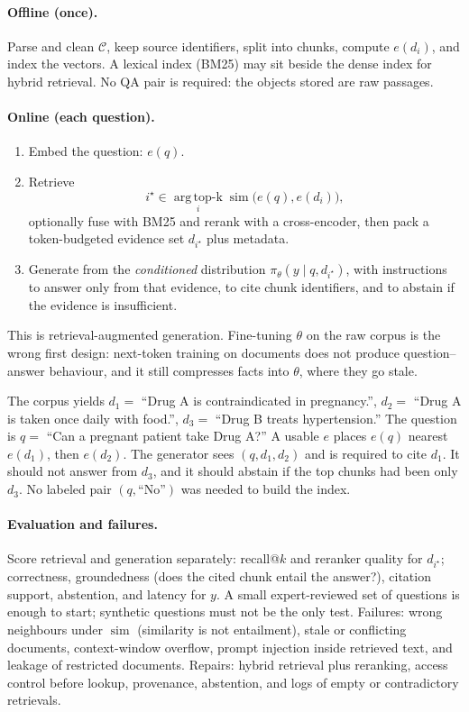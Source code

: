 \documentclass[11pt,a4paper]{article}
\theoremstyle{definition}
\begin{document}
\paragraph{Offline (once).}
Parse and clean \(\mathcal{C}\), keep source identifiers, split into chunks, compute \(e(d_i)\), and index the vectors. A lexical index (BM25) may sit beside the dense index for hybrid retrieval. No QA pair is required: the objects stored are raw passages.

\paragraph{Online (each question).}
\begin{enumerate}
    \item Embed the question: \(e(q)\).
    \item Retrieve
    \[
    i^\star\in\operatorname*{arg\,top\text{-}k}_{i}\operatorname{sim}\bigl(e(q),e(d_i)\bigr),
    \]
    optionally fuse with BM25 and rerank with a cross-encoder, then pack a token-budgeted evidence set \(d_{i^\star}\) plus metadata.
    \item Generate from the \emph{conditioned} distribution \(\pi_\theta(y\mid q,d_{i^\star})\), with instructions to answer only from that evidence, to cite chunk identifiers, and to abstain if the evidence is insufficient.
\end{enumerate}
This is retrieval-augmented generation. Fine-tuning \(\theta\) on the raw corpus is the wrong first design: next-token training on documents does not produce question--answer behaviour, and it still compresses facts into \(\theta\), where they go stale.

\begin{example}
The corpus yields \(d_1=\) ``Drug A is contraindicated in pregnancy.'', \(d_2=\) ``Drug A is taken once daily with food.'', \(d_3=\) ``Drug B treats hypertension.'' The question is \(q=\) ``Can a pregnant patient take Drug A?'' A usable \(e\) places \(e(q)\) nearest \(e(d_1)\), then \(e(d_2)\). The generator sees \((q,d_1,d_2)\) and is required to cite \(d_1\). It should not answer from \(d_3\), and it should abstain if the top chunks had been only \(d_3\). No labeled pair \((q,\text{``No''})\) was needed to build the index.
\end{example}

\paragraph{Evaluation and failures.}
Score retrieval and generation separately: recall@\(k\) and reranker quality for \(d_{i^\star}\); correctness, groundedness (does the cited chunk entail the answer?), citation support, abstention, and latency for \(y\). A small expert-reviewed set of questions is enough to start; synthetic questions must not be the only test. Failures: wrong neighbours under \(\operatorname{sim}\) (similarity is not entailment), stale or conflicting documents, context-window overflow, prompt injection inside retrieved text, and leakage of restricted documents. Repairs: hybrid retrieval plus reranking, access control before lookup, provenance, abstention, and logs of empty or contradictory retrievals.
\end{document}
